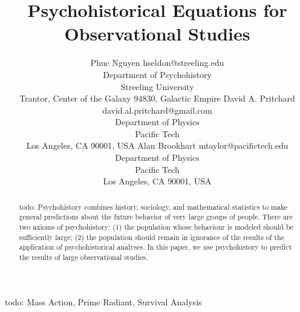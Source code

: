 \documentclass[twoside,11pt]{article}
\newcommand{\todo}[1]{{\color{purple} todo: {#1}}}
\begin{document}
\title{Psychohistorical Equations for Observational Studies}

\author{\name Phuc Nguyen \email hseldon@streeling.edu \\
       \addr Department of Psychohistory\\
       Streeling University\\
       Trantor, Center of the Galaxy 94830, Galactic Empire 
       \AND
       \name David A. Pritchard \email david.al.pritchard@gmail.com \\
       \addr Department of Physics\\
       Pacific Tech \\
       Los Angeles, CA 90001, USA
       \AND
       \name Alan Brookhart \email mtaylor@pacifictech.edu \\
       \addr Department of Physics\\
       Pacific Tech \\
       Los Angeles, CA 90001, USA
       }

\maketitle

\begin{abstract}%
\todo{}Psychohistory combines history, sociology, and mathematical statistics to make general predictions about the future behavior of very large groups of people. There are two axioms of psychohistory: (1) the population whose behaviour is modeled should be sufficiently large; (2) the population should remain in ignorance of the results of the application of psychohistorical analyses.  In this paper, we use psychohistory to predict the results of large observational studies.
\end{abstract}

\begin{keywords}
  \todo{}Mass Action, Prime Radiant, Survival Analysis
\end{keywords}





\end{document}
